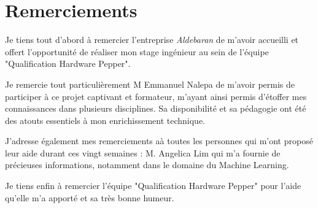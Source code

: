 \chapter*{Remerciements}
\thispagestyle{fancy}

Je tiens tout d'abord à remercier l'entreprise \emph{Aldebaran} de m'avoir accueilli et offert l'opportunité de réaliser mon stage ingénieur au sein de l'équipe "Qualification Hardware Pepper".

Je remercie tout particulièrement M Emmanuel Nalepa de m'avoir permis de participer à ce projet captivant et formateur, m'ayant ainsi permis d'étoffer mes connaissances dans plusieurs disciplines.  Sa disponibilité et sa pédagogie ont été des atouts essentiels à mon enrichissement technique.

J’adresse également mes remerciements aà toutes les personnes qui m’ont proposé leur aide durant ces vingt semaines :
M. Angelica Lim qui m’a fournie de précieuses informations, notamment dans le domaine du Machine Learning.

Je tiens enfin à remercier l'équipe "Qualification Hardware Pepper" pour l'aide qu'elle m'a apporté et sa très bonne humeur.

